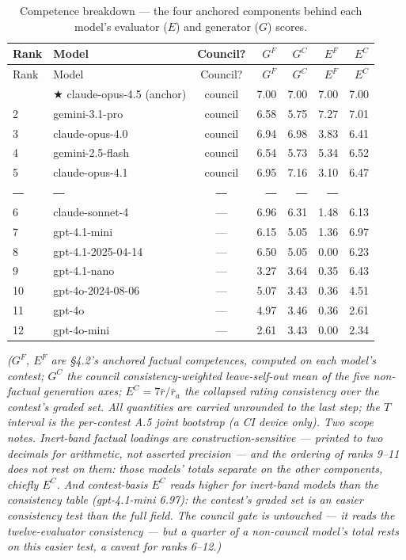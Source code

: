 \begin{longtable}[]{@{}llcrrrr@{}}
\caption{Competence breakdown --- the four anchored components behind each model's evaluator (\(E\)) and generator (\(G\)) scores.}\tabularnewline
\toprule\noalign{}
Rank & Model & Council? & \(G^{F}\) & \(G^{C}\) & \(E^{F}\) & \(E^{C}\) \\
\midrule\noalign{}
\endfirsthead
\toprule\noalign{}
Rank & Model & Council? & \(G^{F}\) & \(G^{C}\) & \(E^{F}\) & \(E^{C}\) \\
\midrule\noalign{}
\endhead
\bottomrule\noalign{}
\endlastfoot
1 & ★ claude-opus-4.5 (anchor) & council & 7.00 & 7.00 & 7.00 & 7.00 \\
2 & gemini-3.1-pro & council & 6.58 & 5.75 & 7.27 & 7.01 \\
3 & claude-opus-4.0 & council & 6.94 & 6.98 & 3.83 & 6.41 \\
4 & gemini-2.5-flash & council & 6.54 & 5.73 & 5.34 & 6.52 \\
5 & claude-opus-4.1 & council & 6.95 & 7.16 & 3.10 & 6.47 \\
⎯⎯ & ⎯⎯ & ⎯⎯ & ⎯⎯ & ⎯⎯ & ⎯⎯ & \\
6 & claude-sonnet-4 & --- & 6.96 & 6.31 & 1.48 & 6.13 \\
7 & gpt-4.1-mini & --- & 6.15 & 5.05 & 1.36 & 6.97 \\
8 & gpt-4.1-2025-04-14 & --- & 6.50 & 5.05 & 0.00 & 6.23 \\
9 & gpt-4.1-nano & --- & 3.27 & 3.64 & 0.35 & 6.43 \\
10 & gpt-4o-2024-08-06 & --- & 5.07 & 3.43 & 0.36 & 4.51 \\
11 & gpt-4o & --- & 4.97 & 3.46 & 0.36 & 2.61 \\
12 & gpt-4o-mini & --- & 2.61 & 3.43 & 0.00 & 2.34 \\
\end{longtable}

\emph{(\(G^{F}\), \(E^{F}\) are §4.2's anchored factual competences, computed on each model's contest; \(G^{C}\) the council consistency-weighted leave-self-out mean of the five non-factual generation axes; \(E^{C}=7\bar r/\bar r_a\) the collapsed rating consistency over the contest's graded set. All quantities are carried unrounded to the last step; the \(T\) interval is the per-contest A.5 joint bootstrap (a CI device only). Two scope notes. Inert-band factual loadings are construction-sensitive --- printed to two decimals for arithmetic, not asserted precision --- and the ordering of ranks 9--11 does not rest on them: those models' totals separate on the other components, chiefly \(E^{C}\). And contest-basis \(E^{C}\) reads higher for inert-band models than the consistency table (gpt-4.1-mini 6.97): the contest's graded set is an easier consistency test than the full field. The council gate is untouched --- it reads the twelve-evaluator consistency --- but a quarter of a non-council model's total rests on this easier test, a caveat for ranks 6--12.)}

